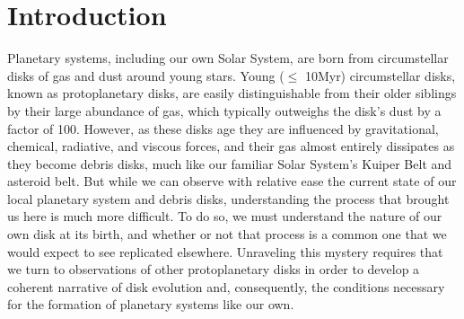 \chapter{Introduction}
\label{chap:introduction}

%


Planetary systems, including our own Solar System, are born from circumstellar disks of gas and dust around young stars. Young ($\leq$ 10Myr) circumstellar disks, known as protoplanetary disks, are easily distinguishable from their older siblings by their large abundance of gas, which typically outweighs the disk's dust by a factor of 100. However, as these disks age they are influenced by gravitational, chemical, radiative, and viscous forces, and their gas almost entirely dissipates as they become debris disks, much like our familiar Solar System's Kuiper Belt and asteroid belt. But while we can observe with relative ease the current state of our local planetary system and debris disks, understanding the process that brought us here is much more difficult. To do so, we must understand the nature of our own disk at its birth, and whether or not that process is a common one that we would expect to see replicated elsewhere. Unraveling this mystery requires that we turn to observations of other protoplanetary disks in order to develop a coherent narrative of disk evolution and, consequently, the conditions necessary for the formation of planetary systems like our own.

